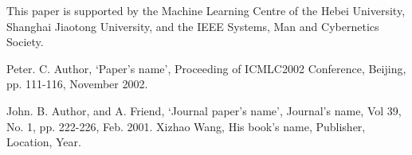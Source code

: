 \documentclass[a4paper, times, 10pt,twocolumn]{article}
\begin{document}
This paper is supported by the Machine Learning Centre of the Hebei
University, Shanghai Jiaotong University, and the IEEE Systems, Man
and Cybernetics Society.

%
%

\begin{thebibliography}{99}
Peter. C. Author, `Paper's name', Proceeding of ICMLC2002
Conference, Beijing, pp. 111-116, November 2002.

 John. B. Author, and A. Friend, `Journal paper's name', Journal's
name, Vol 39, No. 1, pp. 222-226, Feb. 2001.
 Xizhao Wang, His book's name, Publisher, Location, Year.
\end{thebibliography}
\end{document}

